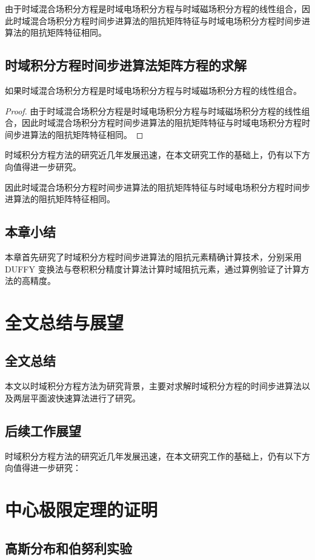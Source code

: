 \documentclass[bachelor]{thesis-uestc}
\begin{document}
由于时域混合场积分方程是时域电场积分方程与时域磁场积分方程的线性组合，因此时域混合场积分方程时间步进算法的阻抗矩阵特征与时域电场积分方程时间步进算法的阻抗矩阵特征相同。

\section{时域积分方程时间步进算法矩阵方程的求解}
\begin{theorem}
如果时域混合场积分方程是时域电场积分方程与时域磁场积分方程的线性组合。
\end{theorem}
\begin{proof}
由于时域混合场积分方程是时域电场积分方程与时域磁场积分方程的线性组合，因此时域混合场积分方程时间步进算法的阻抗矩阵特征与时域电场积分方程时间步进算法的阻抗矩阵特征相同。
\end{proof}
\begin{corollary}
时域积分方程方法的研究近几年发展迅速，在本文研究工作的基础上，仍有以下方向值得进一步研究。
\end{corollary}
\begin{lemma}
因此时域混合场积分方程时间步进算法的阻抗矩阵特征与时域电场积分方程时间步进算法的阻抗矩阵特征相同。
\end{lemma}

\section{本章小结}
本章首先研究了时域积分方程时间步进算法的阻抗元素精确计算技术，分别采用DUFFY 变换法与卷积积分精度计算法计算时域阻抗元素，通过算例验证了计算方法的高精度。

\chapter{全文总结与展望}

\section{全文总结}
本文以时域积分方程方法为研究背景，主要对求解时域积分方程的时间步进算法以及两层平面波快速算法进行了研究。

\section{后续工作展望}
时域积分方程方法的研究近几年发展迅速，在本文研究工作的基础上，仍有以下方向值得进一步研究：

\nocite{*}

%
% 
%
% 
% 
%

\thesisappendix

\chapter{中心极限定理的证明}

\section{高斯分布和伯努利实验}

\end{document}
